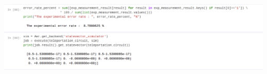 \documentclass[a4paper,12pt]{article}
\begin{document}
\begin{enumerate}
          \includegraphics[scale=0.40]{5.2c/image4.png}
\end{enumerate}
\end{document}
